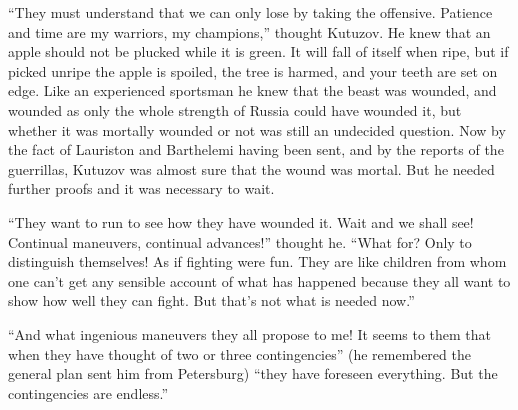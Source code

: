``They must understand that we can only lose by taking the
offensive.  Patience and time are my warriors, my champions,''
thought Kutuzov. He knew that an apple should not be plucked
while it is green. It will fall of itself when ripe, but if
picked unripe the apple is spoiled, the tree is harmed, and your
teeth are set on edge. Like an experienced sportsman he knew that
the beast was wounded, and wounded as only the whole strength of
Russia could have wounded it, but whether it was mortally wounded
or not was still an undecided question. Now by the fact of
Lauriston and Barthelemi having been sent, and by the reports of
the guerrillas, Kutuzov was almost sure that the wound was
mortal. But he needed further proofs and it was necessary to
wait.

``They want to run to see how they have wounded it. Wait and we
shall see! Continual maneuvers, continual advances!'' thought
he. ``What for?  Only to distinguish themselves! As if fighting
were fun. They are like children from whom one can't get any
sensible account of what has happened because they all want to
show how well they can fight. But that's not what is needed
now.''

``And what ingenious maneuvers they all propose to me! It seems
to them that when they have thought of two or three
contingencies'' (he remembered the general plan sent him from
Petersburg) ``they have foreseen everything. But the
contingencies are endless.''

